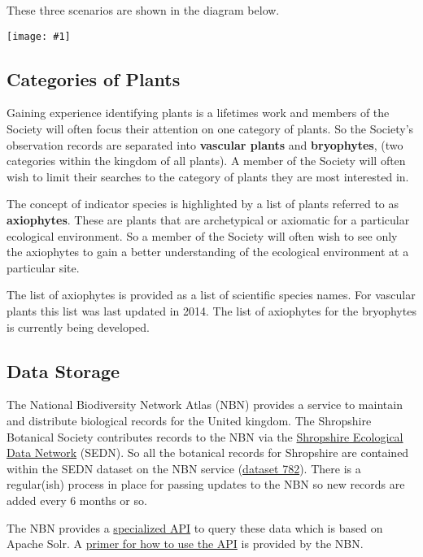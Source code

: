 \documentclass[a4paper,12pt,landscape]{article}
\newcommand{\wireframe}[1]{\texttt{[image: \#1]}\clearpage}
\begin{document}
\begin{multicols*}{2}
  These three scenarios are shown in the diagram below.
  \clearpage

  \wireframe{./wireframes/Overview.png}%

  \subsection{Categories of Plants}
  Gaining experience identifying plants is a lifetimes work
  and members of the Society will often
  focus their attention on one category of plants.
  So the Society's observation records
  are separated into \textbf{vascular plants} and \textbf{bryophytes},
  (two categories within the kingdom of all plants).
  A member of the Society will often wish to limit their searches to the
  category of plants they are most interested in.

  The concept of indicator species is highlighted
  by a list of plants
  referred to as \textbf{axiophytes}.
  These are plants that are archetypical or axiomatic for a particular ecological environment.
  So a member of the Society
  will often wish to see only the axiophytes
  to gain a better understanding of the ecological environment
  at a particular site.
  
  The list of axiophytes
  is provided as a list of scientific species names. 
  For vascular plants this list
  was last updated in 2014.
  The list of axiophytes for the bryophytes is currently being developed.

  \subsection{Data Storage}
  The National Biodiversity Network Atlas (NBN)
  provides a service to maintain and distribute biological records
  for the United kingdom.
  The Shropshire Botanical Society contributes records to the NBN
  via the \href{https://sites.google.com/view/sedn/home}{Shropshire Ecological Data Network} (SEDN).
  So all the botanical records for Shropshire
  are contained within the SEDN dataset on the NBN service
  (\href{occurrences/search?q=data_resource_uid%3Adr782}{dataset 782}).
  There is a regular(ish) process in place for passing updates to the NBN
  so new records are added every 6 months or so. 

  The NBN provides a \href{https://api.nbnatlas.org/}{specialized API}
  to query these data which is based on Apache Solr.
  A \href{http://docs.shropshirebotany.org.uk/NBN%20Atlas%20Query%20Primer.pdf}{primer for how to use the API}
  is provided by the NBN.


\end{multicols*}
\end{document}
